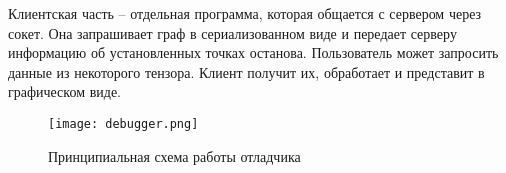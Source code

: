 Клиентская часть -- отдельная программа, которая общается с сервером через сокет.
Она запрашивает граф в сериализованном виде и передает серверу информацию об
установленных точках останова. Пользователь может запросить данные из некоторого
тензора. Клиент получит их, обработает и представит в графическом виде.

\begin{figure}[ht]
    \centering
    \texttt{[image: debugger.png]}
    \caption{Принципиальная схема работы отладчика}
    \label{fig:debugger}
\end{figure}


